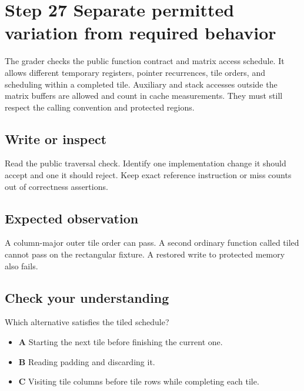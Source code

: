 \section{Step 27 Separate permitted variation from required behavior}\label{transpose-s27}

The grader checks the public function contract and matrix access schedule. It allows different temporary registers, pointer recurrences, tile orders, and scheduling within a completed tile. Auxiliary and stack accesses outside the matrix buffers are allowed and count in cache measurements. They must still respect the calling convention and protected regions.

\subsection{Write or inspect}
Read the public traversal check. Identify one implementation change it should accept and one it should reject. Keep exact reference instruction or miss counts out of correctness assertions.

\subsection{Expected observation}
A column-major outer tile order can pass. A second ordinary function called tiled cannot pass on the rectangular fixture. A restored write to protected memory also fails.

\subsection{Check your understanding}
Which alternative satisfies the tiled schedule?

\begin{itemize}
  \item \textbf{A} Starting the next tile before finishing the current one.
  \item \textbf{B} Reading padding and discarding it.
  \item \textbf{C} Visiting tile columns before tile rows while completing each tile.
\end{itemize}
